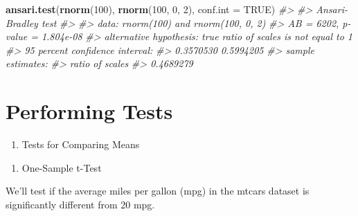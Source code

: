 \documentclass[
]{book}
\newenvironment{Shaded}{\begin{snugshade}}{\end{snugshade}}
\newcommand{\AttributeTok}[1]{\textcolor[rgb]{0.13,0.29,0.53}{#1}}
\newcommand{\CommentTok}[1]{\textcolor[rgb]{0.56,0.35,0.01}{\textit{#1}}}
\newcommand{\ConstantTok}[1]{\textcolor[rgb]{0.56,0.35,0.01}{#1}}
\newcommand{\DecValTok}[1]{\textcolor[rgb]{0.00,0.00,0.81}{#1}}
\newcommand{\FunctionTok}[1]{\textcolor[rgb]{0.13,0.29,0.53}{\textbf{#1}}}
\newcommand{\NormalTok}[1]{#1}
\newcommand{\SpecialCharTok}[1]{\textcolor[rgb]{0.81,0.36,0.00}{\textbf{#1}}}
\providecommand{\tightlist}{%
  \setlength{\itemsep}{0pt}\setlength{\parskip}{0pt}}
\begin{document}
\begin{Shaded}
\begin{Highlighting}[]
\FunctionTok{ansari.test}\NormalTok{(}\FunctionTok{rnorm}\NormalTok{(}\DecValTok{100}\NormalTok{), }\FunctionTok{rnorm}\NormalTok{(}\DecValTok{100}\NormalTok{, }\DecValTok{0}\NormalTok{, }\DecValTok{2}\NormalTok{), }\AttributeTok{conf.int =} \ConstantTok{TRUE}\NormalTok{)}
\CommentTok{\#\textgreater{} }
\CommentTok{\#\textgreater{}  Ansari{-}Bradley test}
\CommentTok{\#\textgreater{} }
\CommentTok{\#\textgreater{} data:  rnorm(100) and rnorm(100, 0, 2)}
\CommentTok{\#\textgreater{} AB = 6202, p{-}value = 1.804e{-}08}
\CommentTok{\#\textgreater{} alternative hypothesis: true ratio of scales is not equal to 1}
\CommentTok{\#\textgreater{} 95 percent confidence interval:}
\CommentTok{\#\textgreater{}  0.3570530 0.5994205}
\CommentTok{\#\textgreater{} sample estimates:}
\CommentTok{\#\textgreater{} ratio of scales }
\CommentTok{\#\textgreater{}       0.4689279}
\end{Highlighting}
\end{Shaded}

\section*{Performing Tests}\label{performing-tests}

\begin{enumerate}
\def\labelenumi{\arabic{enumi}.}
\tightlist
\item
  Tests for Comparing Means
\end{enumerate}

\begin{enumerate}
\def\labelenumi{\alph{enumi}.}
\tightlist
\item
  One-Sample t-Test
\end{enumerate}

We'll test if the average miles per gallon (mpg) in the mtcars dataset is significantly different from 20 mpg.

\begin{Shaded}
\end{Shaded}
\end{document}
